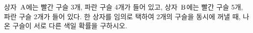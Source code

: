 상자~$\mathrm{A}$에는 빨간 구슬 3개, 파란 구슬 4개가 들어 있고, 상자~$\mathrm{B}$에는 빨간 구슬 5개, 파란 구슬 2개가 들어 있다. 한 상자를 임의로 택하여 2개의 구슬을 동시에 꺼낼 때, 나온 구슬이 서로 다른 색일 확률을 구하시오.
